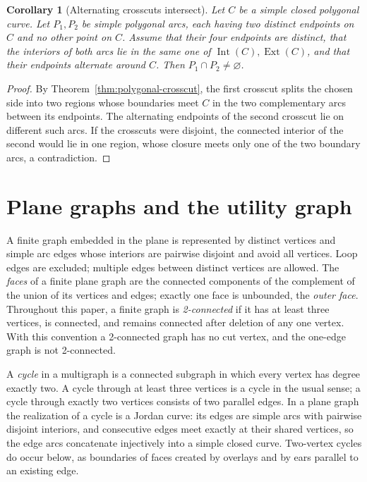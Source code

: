 \documentclass[11pt]{article}
\theoremstyle{mainplain}
\newtheorem{corollary}[theorem]{Corollary}
\theoremstyle{mainroman}
\theoremstyle{definition}
\numberwithin{equation}{section}
\begin{document}
\begin{corollary}[Alternating crosscuts intersect]\label{cor:alternating-crosscuts}
Let $C$ be a simple closed polygonal curve. Let $P_1,P_2$ be simple
polygonal arcs, each having two distinct endpoints on $C$ and no other
point on $C$. Assume that their four endpoints are distinct, that the
interiors of both arcs lie in the same one of
$\operatorname{Int}(C),\operatorname{Ext}(C)$, and that their endpoints
alternate around $C$. Then $P_1\cap P_2\ne\varnothing$.
\end{corollary}
\begin{proof}
By Theorem~\ref{thm:polygonal-crosscut}, the first crosscut splits the chosen side into two regions whose
boundaries meet $C$ in the two complementary arcs between its
endpoints. The alternating endpoints of the second crosscut lie on
different such arcs. If the crosscuts were disjoint, the connected
interior of the second would lie in one region, whose closure meets only
one of the two boundary arcs, a contradiction.
\end{proof}

\section{Plane graphs and the utility graph}

A finite graph embedded in the plane is represented by distinct
vertices and simple arc edges whose interiors are pairwise disjoint and
avoid all vertices. Loop edges are excluded; multiple edges between
distinct vertices are allowed. The \emph{faces} of a finite plane
graph are the connected components of the complement of the union of
its vertices and edges; exactly one face is unbounded, the
\emph{outer face}. Throughout this paper, a finite graph is
\emph{2-connected} if it has at least three vertices, is connected, and
remains connected after deletion of any one vertex. With this convention
a 2-connected graph has no cut vertex, and the one-edge graph is not
2-connected.

A \emph{cycle} in a multigraph is a connected subgraph in which every
vertex has degree exactly two. A cycle through at least three vertices
is a cycle in the usual sense; a cycle through exactly two vertices
consists of two parallel edges. In a plane graph the realization of a
cycle is a Jordan curve: its edges are simple arcs with pairwise
disjoint interiors, and consecutive edges meet exactly at their shared
vertices, so the edge arcs concatenate injectively into a simple
closed curve. Two-vertex cycles do occur below, as boundaries of faces
created by overlays and by ears parallel to an existing edge.
\end{document}
